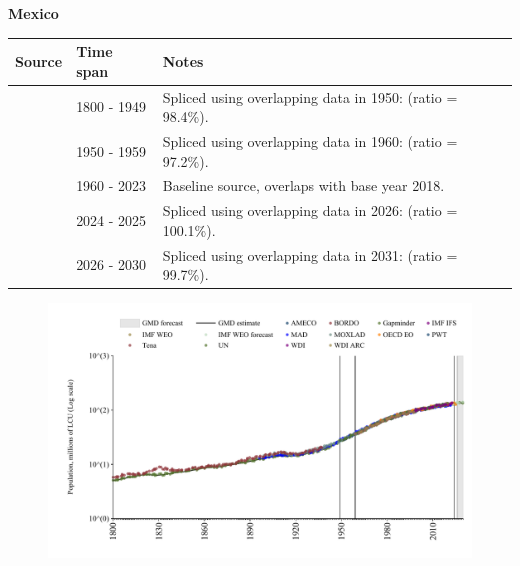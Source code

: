 \documentclass[12pt,a4paper,landscape]{article}
\begin{document}
\begin{adjustbox}{max totalsize={\paperwidth}{\paperheight},center}
\begin{minipage}[t][\textheight][t]{\textwidth}
\vspace*{0.5cm}
{}
\begin{center}
{\Large\bfseries Mexico}
\end{center}
\vspace{0.5cm}
\begin{table}[H]
\centering
\small
\begin{tabular}{|l|l|l|}
\hline
\textbf{Source} & \textbf{Time span} & \textbf{Notes} \\
\hline
\rowcolor{white}\cite{Gapminder}& 1800 - 1949 &Spliced using overlapping data in 1950: (ratio = 98.4\%).\\
\rowcolor{lightgray}\cite{IMF_IFS}& 1950 - 1959 &Spliced using overlapping data in 1960: (ratio = 97.2\%).\\
\rowcolor{white}\cite{WDI}& 1960 - 2023 &Baseline source, overlaps with base year 2018.\\
\rowcolor{lightgray}\cite{OECD_EO}& 2024 - 2025 &Spliced using overlapping data in 2026: (ratio = 100.1\%).\\
\rowcolor{white}\cite{Gapminder}& 2026 - 2030 &Spliced using overlapping data in 2031: (ratio = 99.7\%).\\
\hline
\end{tabular}
\end{table}
\begin{figure}[H]
\centering
\includegraphics[width=\textwidth,height=0.6\textheight,keepaspectratio]{graphs/MEX_pop.pdf}
\end{figure}
\end{minipage}
\end{adjustbox}
\end{document}
